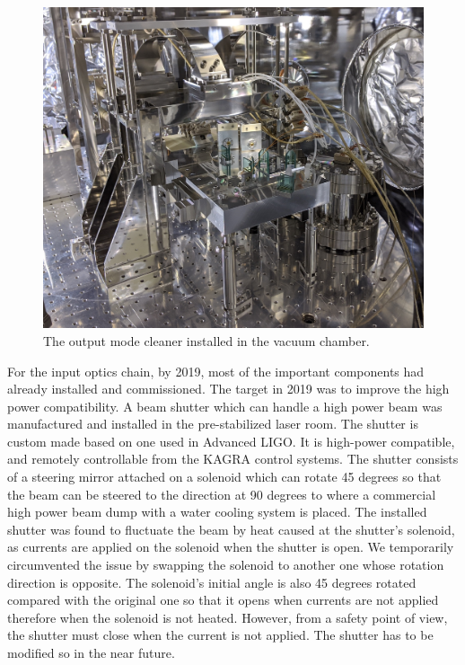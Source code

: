 \begin{figure}[t]
\begin{center}
\includegraphics[scale=0.15]{astrodiv/gw/ioo/omc.jpeg}
\caption{The output mode cleaner installed in the vacuum chamber.}
\label{fig:omc}
\end{center}
\end{figure}


For the input optics chain, by 2019, most of the important components had already installed and commissioned.
The target in 2019 was to improve the high power compatibility.
A beam shutter which can handle a high power beam was manufactured and installed in the pre-stabilized laser room.
The shutter is custom made based on one used in Advanced LIGO.
It is high-power compatible, and remotely controllable from the KAGRA control systems.
The shutter consists of a steering mirror attached on a solenoid which can rotate 45 degrees
so that the beam can be steered to the direction at 90 degrees to where a commercial high power beam dump
with a water cooling system is placed.
The installed shutter was found to fluctuate the beam
by heat caused at the shutter's solenoid,
as currents are applied on the solenoid when the shutter is open.
We temporarily circumvented the issue by swapping the solenoid to another one
whose rotation direction is opposite.
The solenoid's initial angle is also 45 degrees rotated compared with the original one
so that it opens when currents are not applied therefore when the solenoid is not heated.
However, from a safety point of view,
the shutter must close when the current is not applied.
The shutter has to be modified so in the near future.


